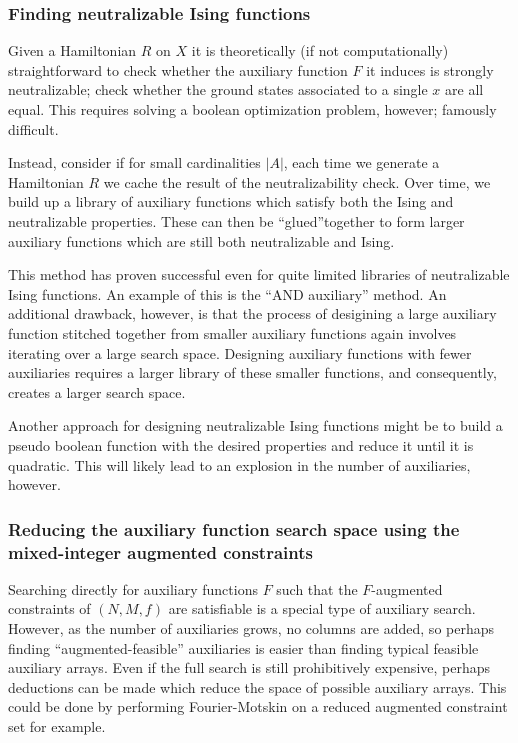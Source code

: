 \documentclass{article}
\begin{document}
\subsubsection{Finding neutralizable Ising functions}

Given a Hamiltonian $R$ on $X$ it is theoretically (if not computationally) straightforward to check whether the auxiliary function $F$ it induces is strongly neutralizable; check whether the ground states associated to a single $x$ are all equal. This requires solving a boolean optimization problem, however; famously difficult.

Instead, consider if for small cardinalities $|A|$, each time we generate a Hamiltonian $R$ we cache the result of the neutralizability check. Over time, we build up a library of auxiliary functions which satisfy both the Ising and neutralizable properties. These can then be ``glued''together to form larger auxiliary functions which are still both neutralizable and Ising.

This method has proven successful even for quite limited libraries of neutralizable Ising functions. An example of this is the ``AND auxiliary'' method. An additional drawback, however, is that the process of desigining a large auxiliary function stitched together from smaller auxiliary functions again involves iterating over a large search space. Designing auxiliary functions with fewer auxiliaries requires a larger library of these smaller functions, and consequently, creates a larger search space.

Another approach for designing neutralizable Ising functions might be to build a pseudo boolean function with the desired properties and reduce it until it is quadratic. This will likely lead to an explosion in the number of auxiliaries, however.

\subsubsection{Reducing the auxiliary function search space using the mixed-integer augmented constraints}

Searching directly for auxiliary functions $F$ such that the $F$-augmented constraints of $(N,M,f)$ are satisfiable is a special type of auxiliary search. However, as the number of auxiliaries grows, no columns are added, so perhaps finding ``augmented-feasible'' auxiliaries is easier than finding typical feasible auxiliary arrays. Even if the full search is still prohibitively expensive, perhaps deductions can be made which reduce the space of possible auxiliary arrays. This could be done by performing Fourier-Motskin on a reduced augmented constraint set for example.
\end{document}
